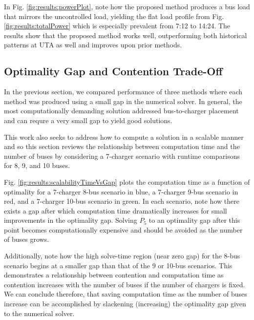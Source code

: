 \par In Fig. \ref{fig:results:powerPlot}, note how the proposed method produces a bus load that mirrors the uncontrolled load, yielding the flat load profile from Fig. \ref{fig:results:totalPower} which is especially prevalent from 7:12 to 14:24. The results show that the proposed method works well, outperforming both historical patterns at UTA as well and improves upon prior methods.
 



\subsection{Optimality Gap and Contention Trade-Off}

In the previous section, we compared performance of three methods where each method was produced using a small gap in the numerical solver.  In general, the most computationally demanding solution addressed bus-to-charger placement and can requre a very small gap to yield good solutions.

\par This work also seeks to address how to compute a solution in a scalable manner and so this section reviews the relationship between computation time and the number of buses by considering a 7-charger scenario with runtime comparisons for 8, 9, and 10 buses.

\par Fig. \ref{fig:results:scalabilityTimeVsGap} plots the computation time as a function of optimality for a 7-charger 8-bus scenario in blue, a 7-charger 9-bus scenario in red, and a 7-charger 10-bus scenario in green. In each scenario, note how there exists a gap after which computation time dramatically increases for small improvements in the optimality gap. Solving $P_5$ to an optimality gap after this point becomes computationally expensive and should be avoided as the number of buses grows.

\par Additionally, note how the high solve-time region (near zero gap) for the 8-bus scenario begins at a smaller gap than that of the 9 or 10-bus scenarios. This demonstrates a relationship between contention and computation time as contention increases with the number of buses if the number of chargers is fixed. We can conclude therefore, that saving computation time as the number of buses increase can be accomplished by slackening (increasing) the optimality gap given to the numerical solver.



